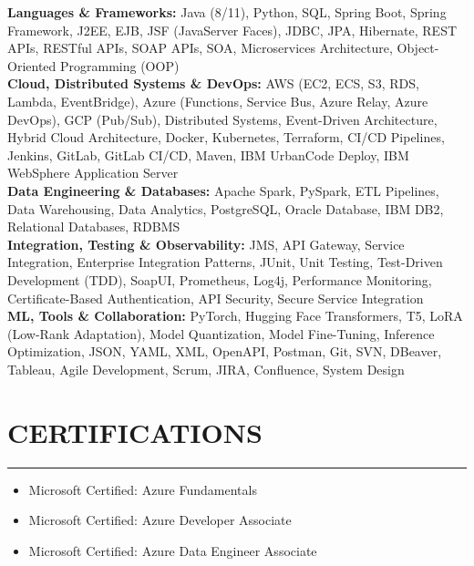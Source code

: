 \documentclass[11pt]{article}
\begin{document}
\textbf{Languages \& Frameworks:} Java (8/11), Python, SQL, Spring Boot, Spring Framework, J2EE, EJB, JSF (JavaServer Faces), JDBC, JPA, Hibernate, REST APIs, RESTful APIs, SOAP APIs, SOA, Microservices Architecture, Object-Oriented Programming (OOP) \\

\textbf{Cloud, Distributed Systems \& DevOps:} AWS (EC2, ECS, S3, RDS, Lambda, EventBridge), Azure (Functions, Service Bus, Azure Relay, Azure DevOps), GCP (Pub/Sub), Distributed Systems, Event-Driven Architecture, Hybrid Cloud Architecture, Docker, Kubernetes, Terraform, CI/CD Pipelines, Jenkins, GitLab, GitLab CI/CD, Maven, IBM UrbanCode Deploy, IBM WebSphere Application Server \\

\textbf{Data Engineering \& Databases:} Apache Spark, PySpark, ETL Pipelines, Data Warehousing, Data Analytics, PostgreSQL, Oracle Database, IBM DB2, Relational Databases, RDBMS \\

\textbf{Integration, Testing \& Observability:} JMS, API Gateway, Service Integration, Enterprise Integration Patterns, JUnit, Unit Testing, Test-Driven Development (TDD), SoapUI, Prometheus, Log4j, Performance Monitoring, Certificate-Based Authentication, API Security, Secure Service Integration \\

\textbf{ML, Tools \& Collaboration:} PyTorch, Hugging Face Transformers, T5, LoRA (Low-Rank Adaptation), Model Quantization, Model Fine-Tuning, Inference Optimization, JSON, YAML, XML, OpenAPI, Postman, Git, SVN, DBeaver, Tableau, Agile Development, Scrum, JIRA, Confluence, System Design
\section*{CERTIFICATIONS}
\vspace{-1.2em}
\noindent\rule{\linewidth}{0.4pt}
\begin{itemize}[leftmargin=0pt, itemsep=0pt, label=]
\item Microsoft Certified: Azure Fundamentals
\item Microsoft Certified: Azure Developer Associate
\item Microsoft Certified: Azure Data Engineer Associate
\end{itemize}
\end{document}
